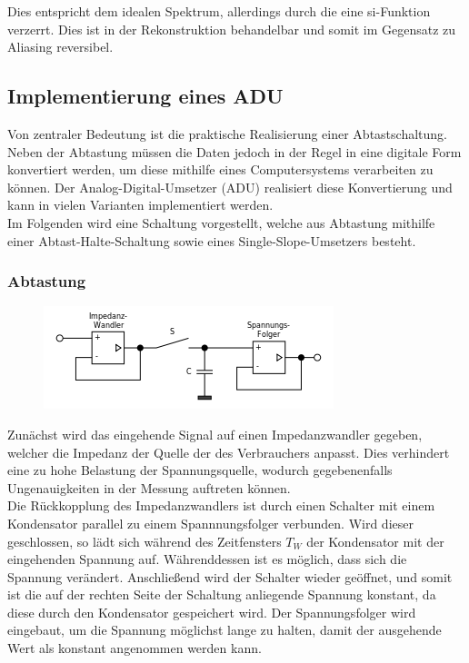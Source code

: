Dies entspricht dem idealen Spektrum, allerdings durch die eine si-Funktion verzerrt. Dies ist in der Rekonstruktion behandelbar und somit im Gegensatz zu Aliasing reversibel.\\

\subsection{Implementierung eines ADU}
Von zentraler Bedeutung ist die praktische Realisierung einer Abtastschaltung. Neben der Abtastung müssen die Daten jedoch in der Regel in eine digitale Form konvertiert werden, um diese mithilfe eines Computersystems verarbeiten zu können. Der Analog-Digital-Umsetzer (ADU) realisiert diese Konvertierung und kann in vielen Varianten implementiert werden.\\
Im Folgenden wird eine Schaltung vorgestellt, welche aus Abtastung mithilfe einer Abtast-Halte-Schaltung sowie eines Single-Slope-Umsetzers besteht.
\subsubsection{Abtastung}
\label{3.3.1}

\begin{figure}[h!]
\centering
\includegraphics[scale=0.8]{images/abtastung_schaltung.png}
\label{sah_schaltung}
\end{figure}

Zunächst wird das eingehende Signal auf einen Impedanzwandler gegeben, welcher die Impedanz der Quelle der des Verbrauchers anpasst. Dies verhindert eine zu hohe Belastung der Spannungsquelle, wodurch gegebenenfalls Ungenauigkeiten in der Messung auftreten können.\\
Die Rückkopplung des Impedanzwandlers ist durch einen Schalter mit einem Kondensator parallel zu einem Spannnungsfolger verbunden. Wird dieser geschlossen, so lädt sich während des Zeitfensters $T_W$ der Kondensator mit der eingehenden Spannung auf. Währenddessen ist es möglich, dass sich die Spannung verändert. Anschließend wird der Schalter wieder geöffnet, und somit ist die auf der rechten Seite der Schaltung anliegende Spannung konstant, da diese durch den Kondensator gespeichert wird. Der Spannungsfolger wird eingebaut, um die Spannung möglichst lange zu halten, damit der ausgehende Wert als konstant angenommen werden kann.\\

